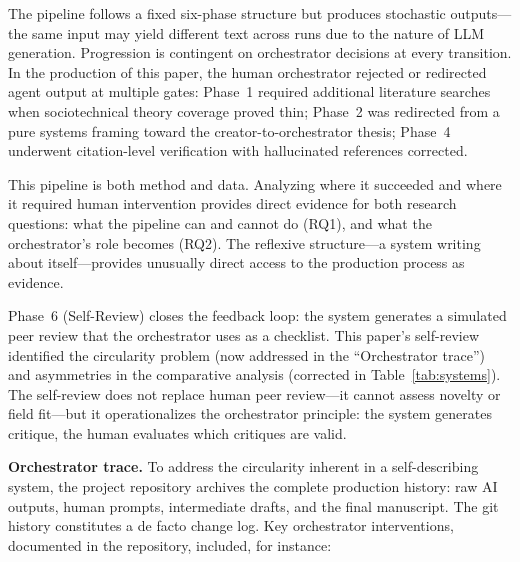 \documentclass{article}
\begin{document}
The pipeline follows a fixed six-phase structure but produces stochastic outputs---the same input may yield different text across runs due to the nature of LLM generation. Progression is contingent on orchestrator decisions at every transition. In the production of this paper, the human orchestrator rejected or redirected agent output at multiple gates: Phase~1 required additional literature searches when sociotechnical theory coverage proved thin; Phase~2 was redirected from a pure systems framing toward the creator-to-orchestrator thesis; Phase~4 underwent citation-level verification with hallucinated references corrected.

This pipeline is both method and data. Analyzing where it succeeded and where it required human intervention provides direct evidence for both research questions: what the pipeline can and cannot do (RQ1), and what the orchestrator's role becomes (RQ2). The reflexive structure---a system writing about itself---provides unusually direct access to the production process as evidence.


Phase~6 (Self-Review) closes the feedback loop: the system generates a simulated peer review that the orchestrator uses as a checklist. This paper's self-review identified the circularity problem (now addressed in the ``Orchestrator trace'') and asymmetries in the comparative analysis (corrected in Table~\ref{tab:systems}). The self-review does not replace human peer review---it cannot assess novelty or field fit---but it operationalizes the orchestrator principle: the system generates critique, the human evaluates which critiques are valid.

\textbf{Orchestrator trace.} To address the circularity inherent in a self-describing system, the project repository archives the complete production history: raw AI outputs, human prompts, intermediate drafts, and the final manuscript. The git history constitutes a de facto change log. Key orchestrator interventions, documented in the repository, included, for instance:
\end{document}
